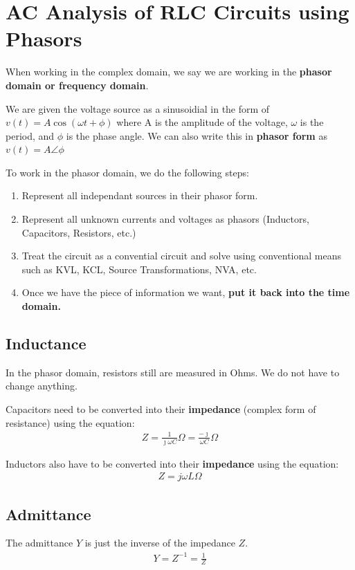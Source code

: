 \documentclass[12pt,letterpaper]{article} \usepackage{amsmath} \usepackage{graphicx} \usepackage[margin=1in]{geometry} \usepackage{longtable}  \usepackage{amssymb}
\begin{document}
	\section{AC Analysis of RLC Circuits using Phasors}
	When working in the complex domain, we say we are working in the \textbf{phasor domain or frequency domain}. 
	
	We are given the voltage source as a sinusoidial in the form of $v(t)=A\cos(\omega t+\phi)$ where A is the amplitude of the voltage, $\omega$ is the period, and $\phi$ is the phase angle. We can also write this in \textbf{phasor form} as $v(t)=A\angle \phi$
	
	To work in the phasor domain, we do the following steps:
	\begin{enumerate}[noitemsep]
		\item Represent all independant sources in their phasor form.
		\item Represent all unknown currents and voltages as phasors (Inductors, Capacitors, Resistors, etc.)
		\item Treat the circuit as a convential circuit and solve using conventional means such as KVL, KCL, Source Transformations, NVA, etc. 
		\item Once we have the piece of information we want, \textbf{put it back into the time domain.}
	\end{enumerate}

	\subsection{Inductance}

	In the phasor domain, resistors still are measured in Ohms. We do not have to change anything. 
	
	Capacitors need to be converted into their \textbf{impedance} (complex form of resistance) using the equation: 
	\begin{align*}
		Z=\frac{1}{\jmath\omega C}\Omega = \frac{-\jmath}{\omega C}\Omega
	\end{align*}

	Inductors also have to be converted into their \textbf{impedance} using the equation:
	\begin{align*}
		Z=j\omega L \Omega
	\end{align*}
	
	\subsection{Admittance}
	The admittance $Y$ is just the inverse of the impedance $Z$. 
	\begin{align*}
		Y=Z^{-1}=\frac{1}{Z}
	\end{align*}
	
\end{document}
